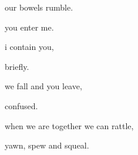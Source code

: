 \documentclass[extrafontsizes, 48pt]{memoir}
\newcommand\blankpage{%
    \null
    \thispagestyle{empty}%
    \addtocounter{page}{-1}%
    \newpage}
\begin{document}
	\begin{minipage}{.6\textwidth}
	our bowels rumble.
	\afterpage{\blankpage}
	\end{minipage}
	\newpage

	\begin{minipage}{.6\textwidth}
	you enter me.
	\end{minipage}
	\newpage

	\begin{minipage}{.6\textwidth}
	i contain you, 
	\end{minipage}
	\newpage

	\begin{minipage}{.6\textwidth}
	briefly.
	\end{minipage}
	\newpage

	\begin{minipage}{.6\textwidth}
	we fall and you leave,
	\end{minipage}
	\newpage

	\begin{minipage}{.6\textwidth}
	confused.
	\afterpage{\blankpage}
	\end{minipage}
	\newpage

	\begin{minipage}{.6\textwidth}
	when we are together we can rattle,
	\end{minipage}
	\newpage

	\begin{minipage}{.6\textwidth}
	yawn, spew and squeal.
	\end{minipage}
	\newpage
\end{document}
